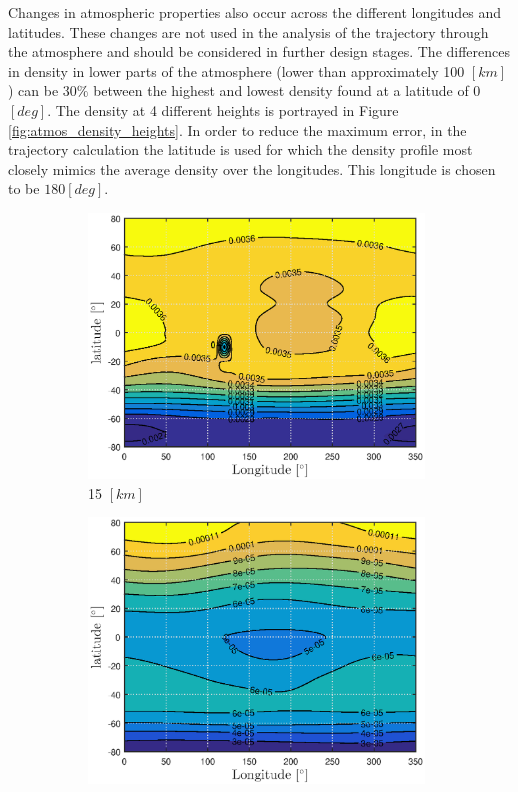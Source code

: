 Changes in atmospheric properties also occur across the different longitudes and latitudes. These changes are not used in the analysis of the trajectory through the atmosphere and should be considered in further design stages. The differences in density in lower parts of the atmosphere (lower than approximately 100 $[km]$) can be $30\%$ between the highest and lowest density found at a latitude of 0 $[deg]$. The density at 4 different heights is portrayed in Figure \ref{fig:atmos_density_heights}. In order to reduce the maximum error, in the trajectory calculation the latitude is used for which the density profile most closely mimics the average density over the longitudes. This longitude is chosen to be $180 \left[deg\right]$.


\begin{figure}[h]
	\centering
	\begin{subfigure}{0.49\textwidth}
		\centering
		\includegraphics[width=0.98\textwidth]{Figure/Atmosphere/density_15km.eps}
		\caption{15 $[km]$} 
		\label{fig:atmos_rho_15km}
	\end{subfigure}
	\begin{subfigure}{0.49\textwidth}
		\centering
		\includegraphics[width=0.98\textwidth]{Figure/Atmosphere/density_50km.eps}

\end{subfigure}
\end{figure}
